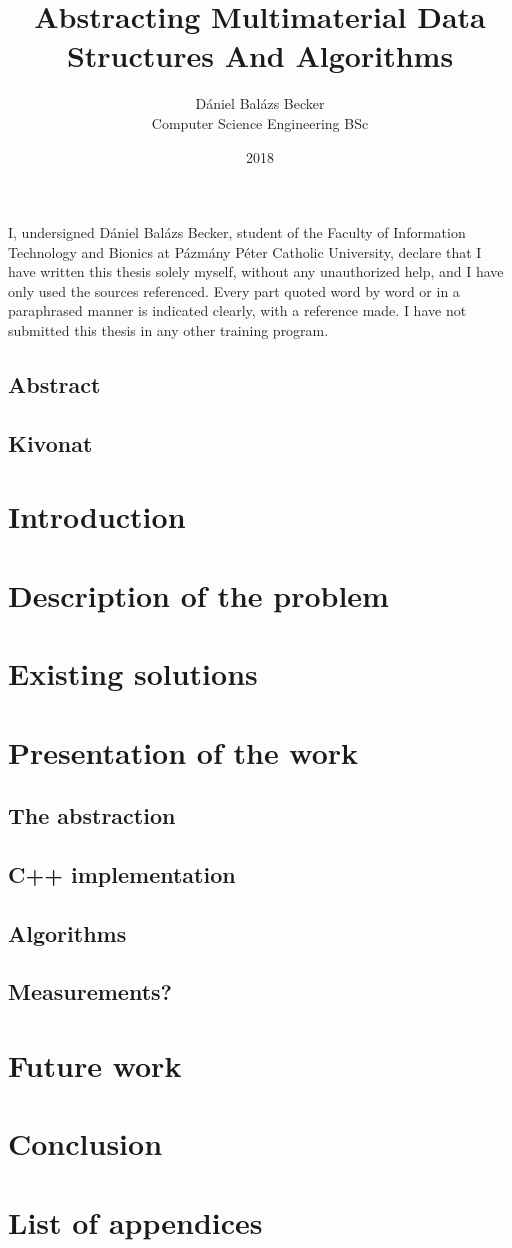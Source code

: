 \documentclass[fontsize=11pt, appendixprefix=true]{scrreprt}
\author{Dániel Balázs Becker\\Computer Science Engineering BSc}
\title{Abstracting Multimaterial Data Structures And Algorithms}
\date{2018}
\newcommand{\pushtobottom}{\vspace*{\fill}}
\newcommand{\signatureline}[1]{\begin{flushright}
	\vspace*{.5cm}\par\noindent\makebox[2.5in]{\hrulefill}
	\par\noindent\makebox[2.5in][c]{#1}
	\end{flushright}
}
\begin{document}
\maketitle

\pushtobottom
I, undersigned Dániel Balázs Becker, student of the Faculty of
Information Technology and Bionics at Pázmány Péter Catholic University, declare
that I have written this thesis solely myself, without any unauthorized
help, and I have only used the sources referenced. Every part quoted word by
word or in a paraphrased manner is indicated clearly, with a reference made. I
have not submitted this thesis in any other training program.
\signatureline{Signature}

\tableofcontents
\newpage
\section*{Abstract}

\newpage
\section*{Kivonat}
\begin{otherlanguage}{magyar}
\end{otherlanguage}

\chapter{Introduction}

\chapter{Description of the problem}
\chapter{Existing solutions}
\chapter{Presentation of the work}

\section{The abstraction}
\section{C++ implementation}
\section{Algorithms}
\section{Measurements?}

\chapter{Future work}

\chapter{Conclusion}

\printbibliography
\appendix
\chapter{List of appendices}
\end{document}
